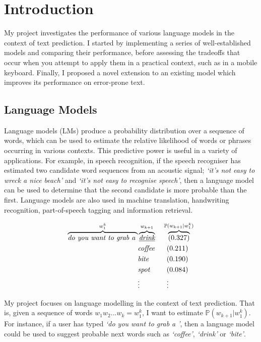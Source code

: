 \documentclass[a4paper, 12pt]{report}
\newcommand{\tit}[1]{\textit{#1}}
\begin{document}
\tableofcontents


\pagestyle{headings}


\chapter{Introduction}

My project investigates the performance of various language models in the context of text prediction. I started by implementing a series of well-established models and comparing their performance, before assessing the tradeoffs that occur when you attempt to apply them in a practical context, such as in a mobile keyboard. Finally, I proposed a novel extension to an existing model which improves its performance on error-prone text.

\section{Language Models}

Language models (LMs) produce a probability distribution over a sequence of words, which can be used to estimate the relative likelihood of words or phrases occurring in various contexts. This predictive power is useful in a variety of applications. For example, in speech recognition, if the speech recogniser has estimated two candidate word sequences from an acoustic signal; \tit{`it's not easy to wreck a nice beach'} and \tit{`it's not easy to recognise speech'}, then a language model can be used to determine that the second candidate is more probable than the first. Language models are also used in machine translation, handwriting recognition, part-of-speech tagging and information retrieval.

\begin{alignat*}{2}
	\overbrace{\tit{do you want to grab a }}^{w_1^k}&\overbrace{\underline{\tit{drink}}}^{w_{k+1}} &&\hspace{0.5mm}\overbrace{(0.327)}^{\mathbb{P}(w_{k + 1} | w_1^k)} \\
	&\tit{coffee} &&\ \ (0.211) \\
	&\tit{bite} &&\ \ (0.190) \\
	&\tit{spot} &&\ \ (0.084) \\
	&\vdots &&\ \ \vdots
\end{alignat*}

My project focuses on language modelling in the context of text prediction. That is, given a sequence of words $w_1w_2...w_k = w_1^k$, I want to estimate $\mathbb{P}(w_{k + 1} | w_1^k)$. For instance, if a user has typed \tit{`do you want to grab a '}, then a language model could be used to suggest probable next words such as \tit{`coffee'}, \tit{`drink'} or \tit{`bite'}.
\end{document}
